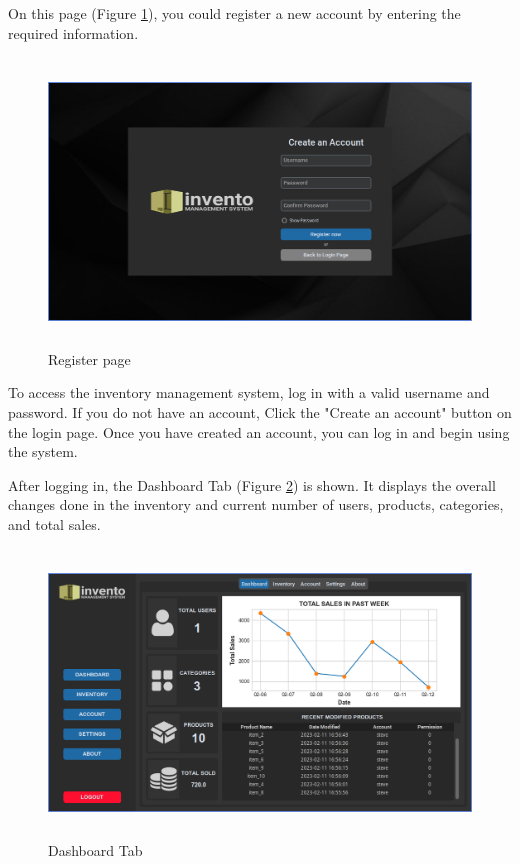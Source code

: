 \documentclass[12pt,a4paper]{article}
\renewcommand{\indent}{\hspace\parindent}
\begin{document}
        \indent
        On this page (Figure \ref{fig:register}), you could register a new 
        account by entering the required information.

        \begin{figure}[ht]
          \centering
          \includegraphics[width=5in,height=3in]{Register.png}
          \caption{Register page}
          \label{fig:register}
        \end{figure}

        To access the inventory management system, log in with a valid username 
        and password. If you do not have an account, Click the "Create an account"
        button on the login page. Once you have created an account, you can log 
        in and begin using the system.

        After logging in, the Dashboard Tab (Figure \ref{fig:dashboard}) is shown. 
        It displays the overall changes done in the inventory and current number of
        users, products, categories, and total sales. 

        \begin{figure}[ht]
          \centering
          \includegraphics[width=5in,height=3in]{Dashboard.png}
          \caption{Dashboard Tab}
          \label{fig:dashboard}
        \end{figure}
\end{document}
